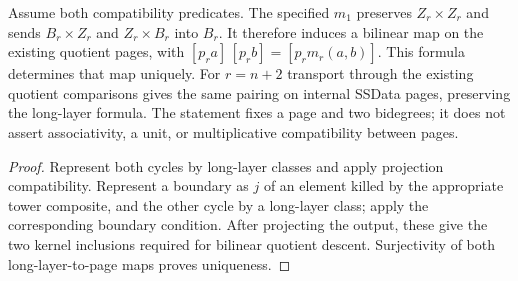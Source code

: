 \begin{proposition}
  \label{prop:h6-long-pairing-descent}
  \leanok
  Assume both compatibility predicates. The specified $m_1$ preserves
  $Z_r\times Z_r$ and sends $B_r\times Z_r$ and $Z_r\times B_r$ into
  $B_r$. It therefore induces a bilinear map on the existing quotient
  pages, with $[p_ra]\,[p_rb]=[p_rm_r(a,b)]$.
  This formula determines that map uniquely. For $r=n+2$ transport through
  the existing quotient comparisons gives the same pairing on internal
  SSData pages, preserving the long-layer formula.
  The statement fixes a page and two bidegrees; it does not assert
  associativity, a unit, or multiplicative compatibility between pages.
\end{proposition}
\begin{proof}
  Represent both cycles by long-layer classes and apply projection
  compatibility. Represent a boundary as $j$ of an element killed by the
  appropriate tower composite, and the other cycle by a long-layer class;
  apply the corresponding boundary condition. After projecting the output,
  these give the two kernel inclusions required for bilinear quotient descent.
  Surjectivity of both long-layer-to-page maps proves uniqueness.
  \leanok
\end{proof}

